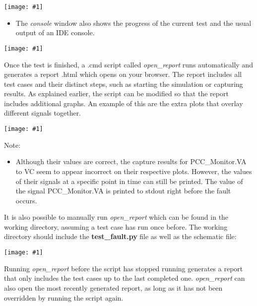 \documentclass{article}
\newcommand{\centerimage}[2]{%
    \begin{center}
        \centerline{\texttt{[image: \#1]}}
    \end{center}%
}
\begin{document}
\centerimage{testrun.png}{8cm}

\begin{itemize}
    \item The \textit{console} window also shows the progress of the current test and the usual output of an IDE console. 
\end{itemize}

\centerimage{testconsole.png}{7cm}

Once the test is finished, a .cmd script called \textit{open\_report} runs automatically and generates a report .html which opens on your browser. The report includes all test cases and their distinct steps, such as starting the simulation or capturing results. As explained earlier, the script can be modified so that the report includes additional graphs. An example of this are the extra plots that overlay different signals together.

\centerimage{allureresults.png}{17cm}

\noindent Note:
\begin{itemize}
    \item Although their values are correct, the capture results for PCC\_Monitor.VA to VC seem to appear incorrect on their respective plots. However, the values of their signals at a specific point in time can still be printed. The value of the signal PCC\_Monitor.VA is printed to stdout right before the fault occurs.
\end{itemize}

It is also possible to manually run \textit{open\_report} which can be found in the working directory, assuming a test case has run once before. The working directory should include the \textbf{test\_fault.py} file as well as the schematic file: 

\centerimage{workingdirectory.png}{10cm}

Running \textit{open\_report} before the script has stopped running generates a report that only includes the test cases up to the last completed one. \textit{open\_report} can also open the most recently generated report, as long as it has not been overridden by running the script again. 
\end{document}
